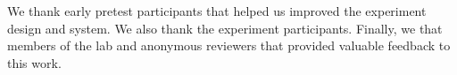 \begin{acks}
We thank early pretest participants that helped us improved the experiment design and system. We also thank the experiment participants. Finally, we that members of the lab and anonymous reviewers that provided valuable feedback to this work.
\end{acks}
